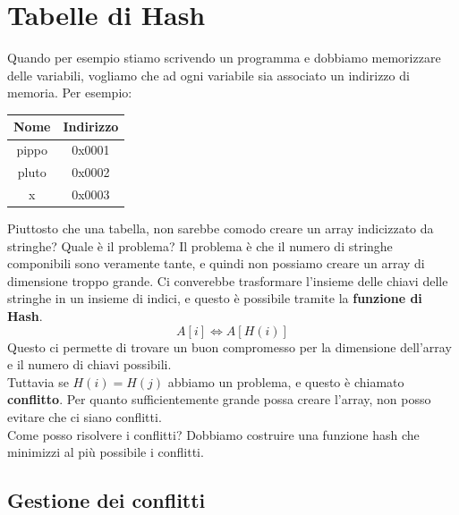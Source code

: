 \documentclass[a4paper]{article}
\begin{document}
\section{Tabelle di Hash}

Quando per esempio stiamo scrivendo un programma e dobbiamo memorizzare delle variabili, vogliamo che ad ogni variabile
sia associato un indirizzo di memoria. Per esempio:

\begin{center}

\begin{tabular}{|c|c|}
  \hline
  Nome & Indirizzo\\
  \hline
  pippo & 0x0001\\
  pluto & 0x0002\\
  x & 0x0003\\
  \hline
\end{tabular}
\end{center}
Piuttosto che una tabella, non sarebbe comodo creare un array indicizzato da stringhe?
Quale è il problema? Il problema è che il numero di stringhe componibili sono veramente tante, e quindi non possiamo creare un array di dimensione troppo grande.
Ci converebbe trasformare l'insieme delle chiavi delle stringhe in un insieme di indici, e questo è possibile tramite la \textbf{funzione di Hash}.
\[A[i] \Longleftrightarrow A[H(i)]\]
Questo ci permette di trovare un buon compromesso per la dimensione dell'array e il numero di chiavi possibili.\\
Tuttavia se $H(i) = H(j)$ abbiamo un problema, e questo è chiamato \textbf{conflitto}.
Per quanto sufficientemente grande possa creare l'array, non posso evitare che ci siano conflitti.\\
Come posso risolvere i conflitti? Dobbiamo costruire una funzione hash che minimizzi al più possibile i conflitti.

\subsection{Gestione dei conflitti}
\end{document}
